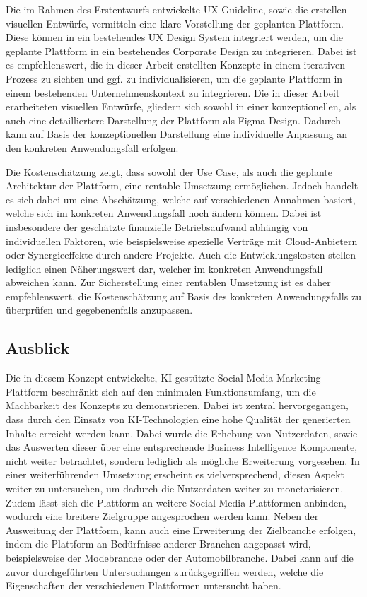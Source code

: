 Die im Rahmen des Erstentwurfs entwickelte \ac{UX} Guideline, sowie die erstellen visuellen Entwürfe, vermitteln eine klare Vorstellung der geplanten Plattform.
Diese können in ein bestehendes \ac{UX} Design System integriert werden, um die geplante Plattform in ein bestehendes Corporate Design zu integrieren.
Dabei ist es empfehlenswert, die in dieser Arbeit erstellten Konzepte in einem iterativen Prozess zu sichten und ggf. zu individualisieren, um die geplante Plattform in einem bestehenden Unternehmenskontext zu integrieren.
Die in dieser Arbeit erarbeiteten visuellen Entwürfe, gliedern sich sowohl in einer konzeptionellen, als auch eine detailliertere Darstellung der Plattform als Figma Design.
Dadurch kann auf Basis der konzeptionellen Darstellung eine individuelle Anpassung an den konkreten Anwendungsfall erfolgen.

Die Kostenschätzung zeigt, dass sowohl der Use Case, als auch die geplante Architektur der Plattform, eine rentable Umsetzung ermöglichen.
Jedoch handelt es sich dabei um eine Abschätzung, welche auf verschiedenen Annahmen basiert, welche sich im konkreten Anwendungsfall noch ändern können.
Dabei ist insbesondere der geschätzte finanzielle Betriebsaufwand abhängig von individuellen Faktoren, wie beispielsweise spezielle Verträge mit Cloud-Anbietern oder Synergieeffekte durch andere Projekte.
Auch die Entwicklungskosten stellen lediglich einen Näherungswert dar, welcher im konkreten Anwendungsfall abweichen kann.
Zur Sicherstellung einer rentablen Umsetzung ist es daher empfehlenswert, die Kostenschätzung auf Basis des konkreten Anwendungsfalls zu überprüfen und gegebenenfalls anzupassen.

\subsection{Ausblick}
Die in diesem Konzept entwickelte, KI-gestützte Social Media Marketing Plattform beschränkt sich auf den minimalen Funktionsumfang, um die Machbarkeit des Konzepts zu demonstrieren.
Dabei ist zentral hervorgegangen, dass durch den Einsatz von KI-Technologien eine hohe Qualität der generierten Inhalte erreicht werden kann.
Dabei wurde die Erhebung von Nutzerdaten, sowie das Auswerten dieser über eine entsprechende Business Intelligence Komponente, nicht weiter betrachtet, sondern lediglich als mögliche Erweiterung vorgesehen.
In einer weiterführenden Umsetzung erscheint es vielversprechend, diesen Aspekt weiter zu untersuchen, um dadurch die Nutzerdaten weiter zu monetarisieren.
Zudem lässt sich die Plattform an weitere Social Media Plattformen anbinden, wodurch eine breitere Zielgruppe angesprochen werden kann.
Neben der Ausweitung der Plattform, kann auch eine Erweiterung der Zielbranche erfolgen, indem die Plattform an Bedürfnisse anderer Branchen angepasst wird, beispielsweise der Modebranche oder der Automobilbranche.
Dabei kann auf die zuvor durchgeführten Untersuchungen zurückgegriffen werden, welche die Eigenschaften der verschiedenen Plattformen untersucht haben.